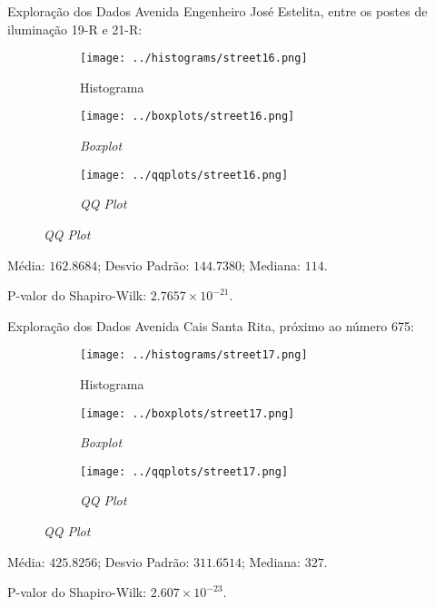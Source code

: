 \begin{frame}{Exploração dos Dados}
Avenida Engenheiro José Estelita, entre os postes de iluminação 19-R e 21-R:
\begin{figure}
	\centering
	\begin{subfigure}{.33\textwidth}
		\centering
		\texttt{[image: ../histograms/street16.png]}
		\caption*{Histograma}
	\end{subfigure}%
	\begin{subfigure}{.33\textwidth}
		\centering
		\texttt{[image: ../boxplots/street16.png]}
		\caption*{\textit{Boxplot}}
	\end{subfigure}
	\begin{subfigure}{.32\textwidth}
		\centering
		\texttt{[image: ../qqplots/street16.png]}
		\caption*{\textit{QQ Plot}}
	\end{subfigure}
\end{figure}
Média: $162.8684$; Desvio Padrão: $144.7380$; Mediana: $114$.

P-valor do Shapiro-Wilk: $2.7657 \times 10^{-21}$.
\end{frame}

\begin{frame}{Exploração dos Dados}
Avenida Cais Santa Rita, próximo ao número 675:
\vskip 0.05cm
\begin{figure}
	\centering
	\begin{subfigure}{.33\textwidth}
		\centering
		\texttt{[image: ../histograms/street17.png]}
		\caption*{Histograma}
	\end{subfigure}%
	\begin{subfigure}{.33\textwidth}
		\centering
		\texttt{[image: ../boxplots/street17.png]}
		\caption*{\textit{Boxplot}}
	\end{subfigure}
	\begin{subfigure}{.32\textwidth}
		\centering
		\texttt{[image: ../qqplots/street17.png]}
		\caption*{\textit{QQ Plot}}
	\end{subfigure}
\end{figure}
\vskip 0.05cm
Média: $425.8256$; Desvio Padrão: $311.6514$; Mediana: $327$.

P-valor do Shapiro-Wilk: $2.607 \times 10^{-23}$.
\end{frame}

